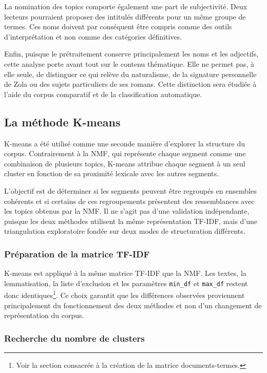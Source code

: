 La nomination des topics comporte également une part de subjectivité. Deux lecteurs pourraient proposer des intitulés différents pour un même groupe de termes. Ces noms doivent par conséquent être compris comme des outils d'interprétation et non comme des catégories définitives.

Enfin, puisque le prétraitement conserve principalement les noms et les adjectifs, cette analyse porte avant tout sur le contenu thématique. Elle ne permet pas, à elle seule, de distinguer ce qui relève du naturalisme, de la signature personnelle de Zola ou des sujets particuliers de ses romans. Cette distinction sera étudiée à l'aide du corpus comparatif et de la classification automatique.

\subsection{La méthode K-means}

K-means a été utilisé comme une seconde manière d'explorer la structure du corpus. Contrairement à la NMF, qui représente chaque segment comme une combinaison de plusieurs topics, K-means attribue chaque segment à un seul cluster en fonction de sa proximité lexicale avec les autres segments.

L'objectif est de déterminer si les segments peuvent être regroupés en ensembles cohérents et si certains de ces regroupements présentent des ressemblances avec les topics obtenus par la NMF. Il ne s'agit pas d'une validation indépendante, puisque les deux méthodes utilisent la même représentation TF-IDF, mais d'une triangulation exploratoire fondée sur deux modes de structuration différents.

\subsubsection{Préparation de la matrice TF-IDF}

K-means est appliqué à la même matrice TF-IDF que la NMF. Les textes, la lemmatisation, la liste d'exclusion et les paramètres \texttt{min\_df} et \texttt{max\_df} restent donc identiques\footnote{Voir la section consacrée à la création de la matrice documents-termes.}. Ce choix garantit que les différences observées proviennent principalement du fonctionnement des deux méthodes et non d'un changement de représentation du corpus.

\subsubsection{Recherche du nombre de clusters}

